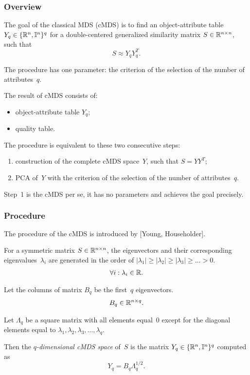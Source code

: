 \documentclass[10pt,a4paper]{article}
\begin{document}
\subsubsection{Overview}

The goal of the classical MDS (cMDS) is to find an object-attribute table $Y_q \in \{\mathbb R^n,\mathbb I^n\}^q$ for a double-centered generalized similarity matrix $S \in \mathbb R^{n \times n}$,
such that
$$ S \approx Y_q Y_q^T. $$

The procedure has one parameter: the criterion of the selection of the number of attributes~$q$.

The result of cMDS consists of:
\begin{itemize}
    \item object-attribute table $Y_q$;
    \item quality table.
\end{itemize}

The procedure is equivalent to these two consecutive steps:
\begin{enumerate}
    \item construction of the complete cMDS space~$Y$, such that $S = YY^T$;
    \item PCA of~$Y$ with the criterion of the selection of the number of attributes~$q$.
\end{enumerate}

Step~1 is the cMDS per se, it has no parameters and achieves the goal precisely.


\subsubsection {Procedure}

The procedure of the cMDS is introduced by [Young, Householder].

For a symmetric matrix $S \in \mathbb R^{n \times n}$,
the eigenvectors and their corresponding eigenvalues~$\lambda_i$
are generated in the order of $|\lambda_1| \ge |\lambda_2| \ge |\lambda_3| \ge \dots > 0$.
$$ \forall i: \lambda_i \in \mathbb R.$$

Let the columns of matrix $B_q$ be the first~$q$ eigenvectors.
$$ B_q \in \mathbb R^{n \times q}.$$

Let $\Lambda_q$ be a square matrix with all elements equal~0
except for the diagonal elements equal to $\lambda_1, \lambda_2, \lambda_3, \dots, \lambda_q$.

Then the {\em $q$-dimensional cMDS space} of~$S$ is the matrix $Y_q \in \{\mathbb R^n,\mathbb I^n\}^q$ computed as
$$ Y_q = B_q \Lambda_q^{1/2}. $$
\end{document}
